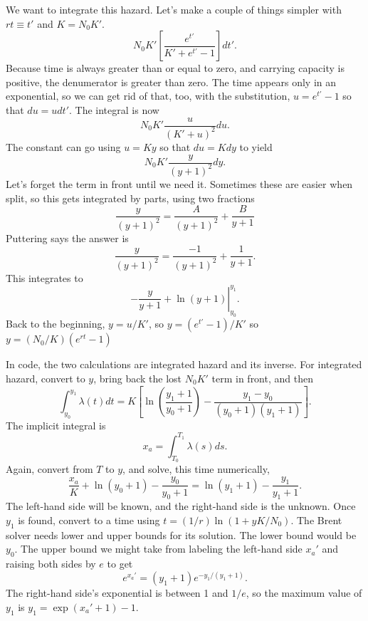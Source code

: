 \documentclass{article}
\begin{document}
We want to integrate this hazard. Let's make a couple of things simpler
with $rt\equiv t'$ and $K=N_0K'$.
\begin{equation}
  N_0K'\left[\frac{e^{t'}}{K'+e^{t'}-1}\right]dt'.
\end{equation}
Because time is always greater than or equal to zero, and carrying
capacity is positive, the denumerator is greater than zero.
The time appears only in an exponential, so we can get rid of
that, too, with the substitution, $u=e^{t'}-1$ so that
$du=udt'$. The integral is now
\begin{equation}
  N_0 K'\frac{u}{(K'+u)^2}du.
\end{equation}
The constant can go using $u=Ky$ so that $du=Kdy$ to yield
\begin{equation}
  N_0 K'\frac{y}{(y+1)^2}dy.
\end{equation}
Let's forget the term in front until we need it.
Sometimes these are easier when split, so
this gets integrated by parts, using two fractions
\begin{equation}
 \frac{y}{(y+1)^2}=\frac{A}{(y+1)^2} + \frac{B}{y+1}
\end{equation}
Puttering says the answer is
\begin{equation}
 \frac{y}{(y+1)^2}=\frac{-1}{(y+1)^2} + \frac{1}{y+1}.
\end{equation}
This integrates to
\begin{equation}
  \left.-\frac{y}{y+1} + \ln(y+1)\right|_{y_0}^{y_1}.
\end{equation}
Back to the beginning, $y=u/K'$, so $y=(e^{t'}-1)/K'$
so $y=(N_0/K)(e^{rt}-1)$

In code, the two calculations are integrated hazard and
its inverse. For integrated hazard, convert to $y$,
bring back the lost $N_0K'$ term in front, and then
\begin{equation}
  \int_{y_0}^{y_1}\lambda(t)dt=K\left[
    \ln\left(\frac{y_1+1}{y_0+1}\right)-\frac{y_1-y_0}{(y_0+1)(y_1+1)}
    \right].
\end{equation}
The implicit integral is
\begin{equation}
  x_a=\int_{T_0}^{T_1}\lambda(s)ds.
\end{equation}
Again, convert from $T$ to $y$, and solve, this time numerically,
\begin{equation}
  \frac{x_a}{K}+\ln(y_0+1)-\frac{y_0}{y_0+1}=\ln(y_1+1)-\frac{y_1}{y_1+1}.
\end{equation}
The left-hand side will be known, and the right-hand side is the unknown.
Once $y_1$ is found, convert to a time using $t=(1/r)\ln(1+yK/N_0)$.
The Brent solver needs lower and upper bounds for its solution. The lower
bound would be $y_0$. The upper bound we might take from
labeling the left-hand side $x_a'$ and raising both sides
by $e$ to get
\begin{equation}
 e^{x_a'}=(y_1+1)e^{-y_1/(y_1+1)}.
\end{equation}
The right-hand side's exponential is between 1 and $1/e$, so the maximum
value of $y_1$ is $y_1=\exp(x_a' + 1)-1$.
\end{document}
